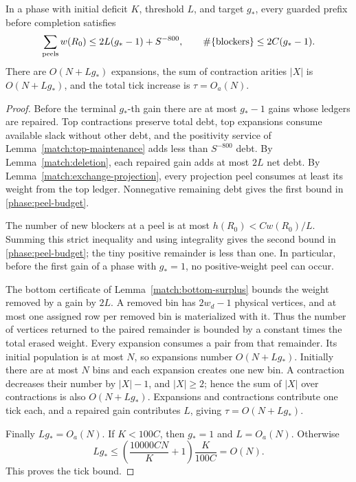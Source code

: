 \begin{lemma}
\label{phase:accounting}
In a phase with initial deficit \(K\), threshold \(L\), and target
\(g_*\), every guarded prefix before completion satisfies
\begin{equation}
\label{phase:peel-budget}
 \sum_{\rm peels}w(R_0)\le2L(g_*-1)+S^{-800},
 \qquad
 \#\{\text{blockers}\}\le2C(g_*-1).
\end{equation}
There are \(O(N+Lg_*)\) expansions, the sum of contraction
arities \(|X|\) is \(O(N+Lg_*)\), and the total tick increase is
\(\tau=O_a(N)\).
\end{lemma}

\begin{proof}
Before the terminal \(g_*\)-th gain there are at most \(g_*-1\)
gains whose ledgers are repaired.  Top contractions preserve
total debt, top expansions consume available slack without
other debt, and the positivity service of
Lemma~\ref{match:top-maintenance} adds less than \(S^{-800}\) debt.
By Lemma~\ref{match:deletion}, each repaired gain adds at most \(2L\)
net debt.  By Lemma~\ref{match:exchange-projection}, every projection
peel consumes at least its weight from the top ledger.
Nonnegative remaining debt gives the first bound in
\eqref{phase:peel-budget}.

The number of new blockers at a peel is at most
\(h(R_0)<Cw(R_0)/L\).  Summing this strict inequality and using
integrality gives the second bound in
\eqref{phase:peel-budget}; the tiny positive remainder is less
than one.  In particular, before the first gain of a phase
with \(g_*=1\), no positive-weight peel can occur.

The bottom certificate of Lemma~\ref{match:bottom-surplus} bounds the
weight removed by a gain by \(2L\).
A removed bin has \(2w_d-1\) physical vertices, and at most one
assigned row per removed bin is materialized with it.  Thus the
number of vertices returned to the paired remainder is bounded
by a constant times the total erased weight.  Every expansion
consumes a pair from that remainder.  Its initial population is
at most \(N\), so expansions number \(O(N+Lg_*)\).
Initially there are at most \(N\) bins and each expansion creates
one new bin.  A contraction decreases their number by
\(|X|-1\), and \(|X|\ge2\); hence the sum of \(|X|\) over
contractions is also \(O(N+Lg_*)\).
Expansions and contractions contribute one tick each, and a
repaired gain contributes \(L\), giving
\(\tau=O(N+Lg_*)\).

Finally \(Lg_*=O_a(N)\).  If \(K<100C\), then \(g_*=1\) and
\(L=O_a(N)\).  Otherwise
\[
 Lg_*\le
 \left(\frac{10000CN}{K}+1\right)\frac{K}{100C}
 =O(N).
 \]
This proves the tick bound.
\end{proof}


